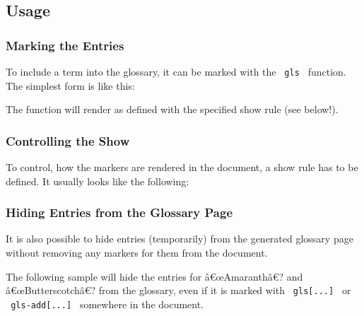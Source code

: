 \subsection{Usage}\label{usage}

\subsubsection{Marking the Entries}\label{marking-the-entries}

To include a term into the glossary, it can be marked with the
\texttt{\ gls\ } function. The simplest form is like this:

\begin{Shaded}
\begin{Highlighting}[]
\end{Highlighting}
\end{Shaded}

The function will render as defined with the specified show rule (see
below!).

\subsubsection{Controlling the Show}\label{controlling-the-show}

To control, how the markers are rendered in the document, a show rule
has to be defined. It usually looks like the following:

\begin{Shaded}
\begin{Highlighting}[]
\end{Highlighting}
\end{Shaded}

\subsubsection{Hiding Entries from the Glossary
Page}\label{hiding-entries-from-the-glossary-page}

It is also possible to hide entries (temporarily) from the generated
glossary page without removing any markers for them from the document.

The following sample will hide the entries for â€œAmaranthâ€? and
â€œButterscotchâ€? from the glossary, even if it is marked with
\texttt{\ gls{[}...{]}\ } or \texttt{\ gls-add{[}...{]}\ } somewhere in
the document.

